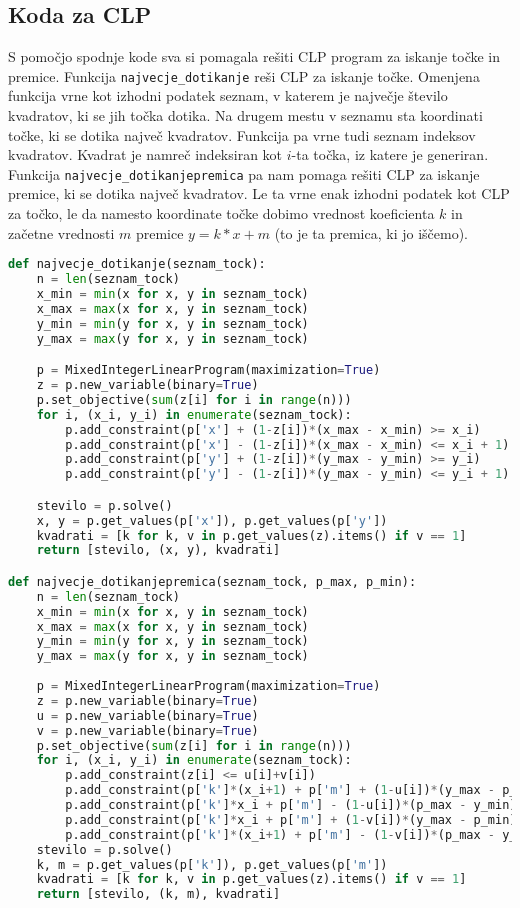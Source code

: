 \documentclass[a4paper]{article}
\begin{document}
\subsection{Koda za CLP }

S pomočjo spodnje kode sva si pomagala rešiti CLP program za iskanje točke in premice. Funkcija \texttt{najvecje\_dotikanje} reši CLP za iskanje točke. Omenjena funkcija vrne kot izhodni podatek seznam, v katerem je največje število kvadratov, ki se jih točka dotika. Na drugem mestu v seznamu sta koordinati točke, ki se dotika največ kvadratov. Funkcija pa vrne tudi seznam indeksov kvadratov. Kvadrat je namreč indeksiran kot $i$-ta točka, iz katere je generiran. Funkcija \texttt{najvecje\_dotikanjepremica} pa nam pomaga rešiti CLP za iskanje premice, ki se dotika največ kvadratov. Le ta vrne enak izhodni podatek kot CLP za točko, le da namesto koordinate točke dobimo vrednost koeficienta $k$ in začetne vrednosti $m$ premice $y = k*x + m$ (to je ta premica, ki jo iščemo).

\begin{lstlisting}[language=Python]
def najvecje_dotikanje(seznam_tock):
    n = len(seznam_tock)
    x_min = min(x for x, y in seznam_tock)
    x_max = max(x for x, y in seznam_tock)
    y_min = min(y for x, y in seznam_tock)
    y_max = max(y for x, y in seznam_tock)

    p = MixedIntegerLinearProgram(maximization=True)
    z = p.new_variable(binary=True) 
    p.set_objective(sum(z[i] for i in range(n))) 
    for i, (x_i, y_i) in enumerate(seznam_tock): 
        p.add_constraint(p['x'] + (1-z[i])*(x_max - x_min) >= x_i)
        p.add_constraint(p['x'] - (1-z[i])*(x_max - x_min) <= x_i + 1)
        p.add_constraint(p['y'] + (1-z[i])*(y_max - y_min) >= y_i)
        p.add_constraint(p['y'] - (1-z[i])*(y_max - y_min) <= y_i + 1)

    stevilo = p.solve()
    x, y = p.get_values(p['x']), p.get_values(p['y'])
    kvadrati = [k for k, v in p.get_values(z).items() if v == 1]
    return [stevilo, (x, y), kvadrati] 

def najvecje_dotikanjepremica(seznam_tock, p_max, p_min): 
    n = len(seznam_tock)
    x_min = min(x for x, y in seznam_tock)
    x_max = max(x for x, y in seznam_tock)
    y_min = min(y for x, y in seznam_tock)
    y_max = max(y for x, y in seznam_tock)
   
    p = MixedIntegerLinearProgram(maximization=True) 
    z = p.new_variable(binary=True) 
    u = p.new_variable(binary=True)
    v = p.new_variable(binary=True)
    p.set_objective(sum(z[i] for i in range(n))) 
    for i, (x_i, y_i) in enumerate(seznam_tock): 
        p.add_constraint(z[i] <= u[i]+v[i])
        p.add_constraint(p['k']*(x_i+1) + p['m'] + (1-u[i])*(y_max - p_min) >= y_i)
        p.add_constraint(p['k']*x_i + p['m'] - (1-u[i])*(p_max - y_min) <= y_i + 1)
        p.add_constraint(p['k']*x_i + p['m'] + (1-v[i])*(y_max - p_min) >= y_i)
        p.add_constraint(p['k']*(x_i+1) + p['m'] - (1-v[i])*(p_max - y_min) <= y_i + 1)
    stevilo = p.solve()
    k, m = p.get_values(p['k']), p.get_values(p['m'])
    kvadrati = [k for k, v in p.get_values(z).items() if v == 1]
    return [stevilo, (k, m), kvadrati] 
\end{lstlisting}
\end{document}
